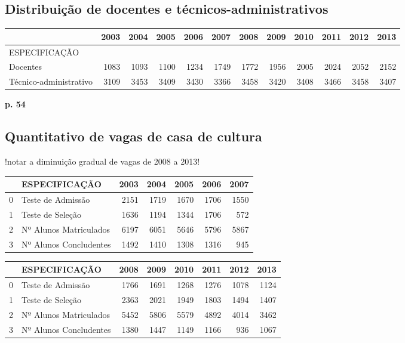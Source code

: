 \documentclass{report}
\begin{document}
\subsection{Distribuição de docentes e técnicos-administrativos}

\begin{tabular}{lrrrrrrrrrrr}
\toprule
{} &  2003 &  2004 &  2005 &  2006 &  2007 &  2008 &  2009 &  2010 &  2011 &  2012 &  2013 \\
\midrule
ESPECIFICAÇÃO          &       &       &       &       &       &       &       &       &       &       &       \\
Docentes               &  1083 &  1093 &  1100 &  1234 &  1749 &  1772 &  1956 &  2005 &  2024 &  2052 &  2152 \\
Técnico-administrativo &  3109 &  3453 &  3409 &  3430 &  3366 &  3458 &  3420 &  3408 &  3466 &  3458 &  3407 \\
\bottomrule
\end{tabular}
\textbf{p. 54}

\subsection{Quantitativo de vagas de casa de cultura}

!notar a diminuição gradual de vagas de 2008 a 2013!

\begin{tabular}{llrrrrr}
\toprule
{} &           ESPECIFICAÇÃO &  2003 &  2004 &  2005 &  2006 &  2007 \\
\midrule
0 &       Teste de Admissão &  2151 &  1719 &  1670 &  1706 &  1550 \\
1 &        Teste de Seleção &  1636 &  1194 &  1344 &  1706 &   572 \\
2 &  Nº Alunos Matriculados &  6197 &  6051 &  5646 &  5796 &  5867 \\
3 &  Nº Alunos Concludentes &  1492 &  1410 &  1308 &  1316 &   945 \\
\bottomrule
\end{tabular}

\begin{tabular}{llrrrrrr}
\toprule
{} &           ESPECIFICAÇÃO &  2008 &  2009 &  2010 &  2011 &  2012 &  2013 \\
\midrule
0 &       Teste de Admissão &  1766 &  1691 &  1268 &  1276 &  1078 &  1124 \\
1 &        Teste de Seleção &  2363 &  2021 &  1949 &  1803 &  1494 &  1407 \\
2 &  Nº Alunos Matriculados &  5452 &  5806 &  5579 &  4892 &  4014 &  3462 \\
3 &  Nº Alunos Concludentes &  1380 &  1447 &  1149 &  1166 &   936 &  1067 \\
\bottomrule
\end{tabular}
\end{document}

